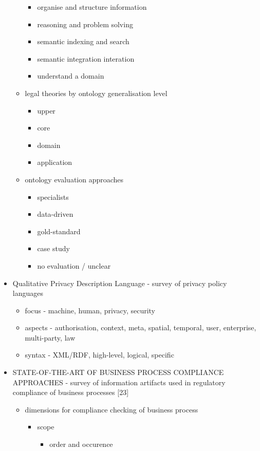 \begin{itemize}
\begin{itemize}
		\begin{itemize}
		\item organise and structure information
		\item reasoning and problem solving
		\item semantic indexing and search
		\item semantic integration interation
		\item understand a domain
		\end{itemize}
	\item legal theories by ontology generalisation level
		\begin{itemize}
		\item upper
		\item core
		\item domain
		\item application
		\end{itemize}
	\item ontology evaluation approaches
		\begin{itemize}
		\item specialists
		\item data-driven
		\item gold-standard
		\item case study
		\item no evaluation / unclear
		\end{itemize}
	\end{itemize}
\item Qualitative Privacy Description Language - survey of privacy policy languages
	\begin{itemize}
	\item focus - machine, human, privacy, security
	\item aspects - authorisation, context, meta, spatial, temporal, user, enterprise, multi-party, law
	\item syntax - XML/RDF, high-level, logical, specific
	\end{itemize}
\item STATE-OF-THE-ART OF BUSINESS PROCESS  COMPLIANCE APPROACHES - survey of information artifacts used in regulatory compliance of business processes [23]
	\begin{itemize}
	\item dimensions for compliance checking of business process
		\begin{itemize}
		\item scope
			\begin{itemize}
			\item order and occurence

\end{itemize}
\end{itemize}
\end{itemize}
\end{itemize}
